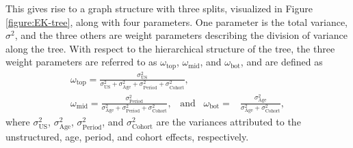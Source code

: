 This gives rise to a graph structure with three splits, visualized in Figure \ref{figure:EK-tree}, along with four parameters. One parameter is the total variance, $\sigma^2$, and the three others are weight parameters describing the division of variance along the tree. With respect to the hierarchical structure of the tree, the three weight parameters are referred to as $\omega_{\text{top}}$, $\omega_{\text{mid}}$, and $\omega_{\text{bot}}$, and are defined as 
\begin{equation}
    \begin{aligned}
    \omega_{\text{top}} = \frac{\sigma^2_{\text{US}}}{\sigma^2_{\text{US}} + \sigma^2_{\text{Age}} + \sigma^2_{\text{Period}} + \sigma^2_{\text{Cohort}}},\; \\
    \omega_{\text{mid}} = \frac{\sigma^2_{\text{Period}}}{\sigma^2_{\text{Age}} + \sigma^2_{\text{Period}} + \sigma^2_{\text{Cohort}}},\;\;\; \text{and}\;\;\; \omega_{\text{bot}} = &\frac{\sigma^2_{\text{Age}}}{\sigma^2_{\text{Age}}+\sigma^2_{\text{Cohort}}},
\end{aligned}
\label{eqn:omega_def}
\end{equation}
where $\sigma^2_{\text{US}}$, $\sigma^2_{\text{Age}}$, $\sigma^2_{\text{Period}}$, and $\sigma^2_{\text{Cohort}}$ are the variances attributed to the unstructured, age, period, and cohort effects, respectively. 

